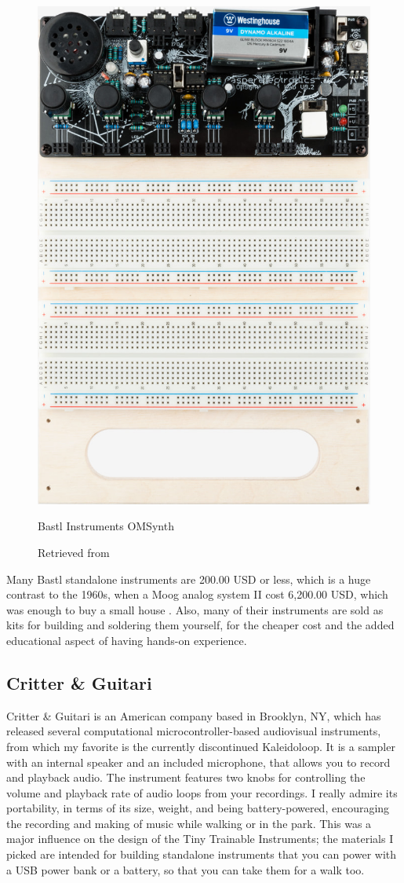 \begin{figure}[ht]
  \centering
  \includegraphics[width=0.75\linewidth,height=0.25\textheight,keepaspectratio]{images/bastl-omsynth.jpg}
  \caption{Bastl Instruments OMSynth}
  \caption*{Retrieved from \cite{website-bastl-instruments-current}}
  \label{fig:bastl-omsynth}
\end{figure}

Many Bastl standalone instruments are 200.00 USD or less, which is a huge contrast to the 1960s, when a Moog analog system II cost 6,200.00 USD, which was enough to buy a small house \cite{analog-days}. Also, many of their instruments are sold as kits for building and soldering them yourself, for the cheaper cost and the added educational aspect of having hands-on experience.

\subsection{Critter \& Guitari}

Critter \& Guitari is an American company based in Brooklyn, NY, which has released several computational microcontroller-based audiovisual instruments, from which my favorite is the currently discontinued Kaleidoloop. It is a sampler with an internal speaker and an included microphone, that allows you to record and playback audio. The instrument features two knobs for controlling the volume and playback rate of audio loops from your recordings. I really admire its portability, in terms of its size, weight, and being battery-powered, encouraging the recording and making of music while walking or in the park. This was a major influence on the design of the Tiny Trainable Instruments; the materials I picked are intended for building standalone instruments that you can power with a USB power bank or a battery, so that you can take them for a walk too.

